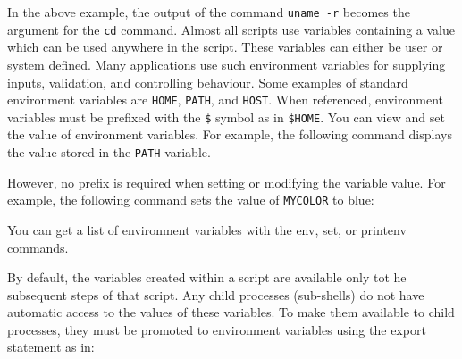 \begin{Shaded}
\begin{Highlighting}[]
\NormalTok{$ } \OtherTok{$(} \OtherTok{)}\NormalTok{/}
\end{Highlighting}
\end{Shaded}

In the above example, the output of the command \texttt{uname -r}
becomes the argument for the \texttt{cd} command. Almost all scripts use
variables containing a value which can be used anywhere in the script.
These variables can either be user or system defined. Many applications
use such environment variables for supplying inputs, validation, and
controlling behaviour. Some examples of standard environment variables
are \texttt{HOME}, \texttt{PATH}, and \texttt{HOST}. When referenced,
environment variables must be prefixed with the \texttt{\$} symbol as in
\texttt{\$HOME}. You can view and set the value of environment
variables. For example, the following command displays the value stored
in the \texttt{PATH} variable.

\begin{Shaded}
\begin{Highlighting}[]
\NormalTok{$ } 
\end{Highlighting}
\end{Shaded}

However, no prefix is required when setting or modifying the variable
value. For example, the following command sets the value of
\texttt{MYCOLOR} to blue:

\begin{Shaded}
\begin{Highlighting}[]
\NormalTok{$ }
\end{Highlighting}
\end{Shaded}

You can get a list of environment variables with the env, set, or
printenv commands.

By default, the variables created within a script are available only tot
he subsequent steps of that script. Any child processes (sub-shells) do
not have automatic access to the values of these variables. To make them
available to child processes, they must be promoted to environment
variables using the export statement as in:

\begin{Shaded}
\begin{Highlighting}[]
 
\end{Highlighting}
\end{Shaded}

